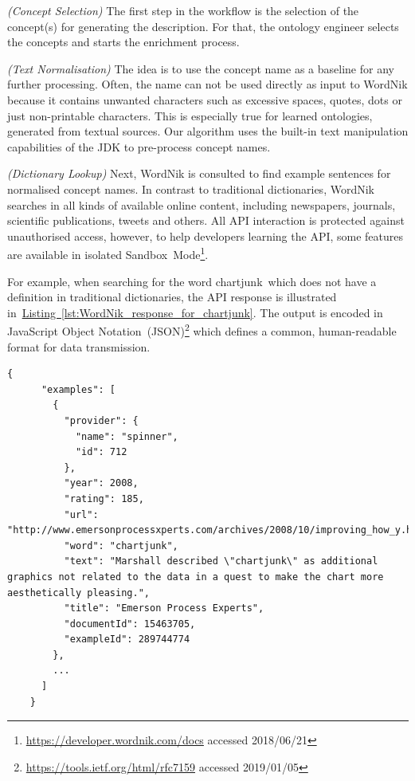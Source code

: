 \begin{enumerate}[label=\textbf{[Step \Roman*]},leftmargin=\widthof{[Step III]}+\labelsep]
	\item \emph{(Concept Selection)} The first step in the workflow is the selection of the concept(s)
	      for generating the description. For that, the ontology engineer selects the concepts and
		  starts the enrichment process. 
	\item \emph{(Text Normalisation)} The idea is to use the concept name as a baseline for any further
	      processing. Often, the name can not be used directly as input to WordNik because it
		  contains unwanted characters such as excessive spaces, quotes, dots or just non-printable
		  characters. This is especially true for learned ontologies, generated from textual sources.
		  Our algorithm uses the built-in text manipulation capabilities of the JDK to pre-process
		  concept names.
	\item \emph{(Dictionary Lookup)} Next, WordNik is consulted to find example sentences for normalised
	      concept names. In contrast to traditional dictionaries, WordNik searches in all kinds of available
		  online content, including newspapers, journals, scientific publications, tweets and others. All
		  API interaction is protected against unauthorised access, however, to help developers learning
		  the API, some features are available in isolated Sandbox~Mode\footnote{\url{https://developer.wordnik.com/docs} accessed  2018/06/21}.
		  
		  For example, when searching for the word \guillemotright chartjunk\guillemotleft~which does not
		  have a definition in traditional dictionaries, the API response is illustrated
		  in~\hyperref[lst:WordNik_response_for_chartjunk]{Listing~\ref*{lst:WordNik_response_for_chartjunk}}. The
		  output is encoded in JavaScript Object Notation~(JSON)\footnote{\url{https://tools.ietf.org/html/rfc7159} accessed 2019/01/05}
		  which defines a common, human-readable format for data transmission. 
\end{enumerate}

\begin{lstlisting}[frame=single,breaklines=true,postbreak=\mbox{\textcolor{black}{$\hookrightarrow$}\space},caption=WordNik API response for the word \guillemotright chartjunk\guillemotleft,label=lst:WordNik_response_for_chartjunk]
	{
	  "examples": [
	    {
	      "provider": {
	        "name": "spinner",
	        "id": 712
	      },
	      "year": 2008,
	      "rating": 185,
	      "url": "http://www.emersonprocessxperts.com/archives/2008/10/improving_how_y.html",
	      "word": "chartjunk",
	      "text": "Marshall described \"chartjunk\" as additional graphics not related to the data in a quest to make the chart more aesthetically pleasing.",
	      "title": "Emerson Process Experts",
	      "documentId": 15463705,
	      "exampleId": 289744774
	    },
		...
	  ]
	}
\end{lstlisting}

